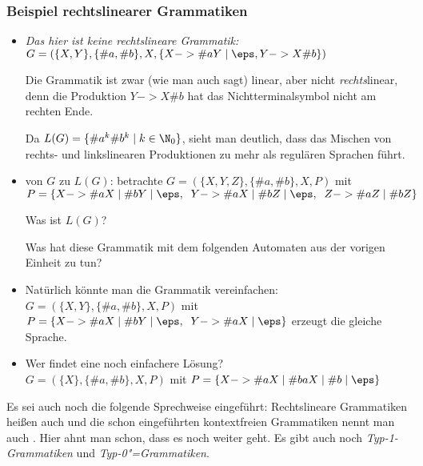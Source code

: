 \begin{tutorium}
  \subsubsection*{Beispiel rechtslinearer Grammatiken}
  \begin{itemize}
  \item \emph{Das hier ist keine rechtslineare Grammatik:} \\
    $G=(\{X, Y\}, \{\#a,\#b\}, X, \{X-> \#a Y \mid \eps, Y ->
    X\#b\})$

    Die Grammatik ist zwar (wie man auch sagt) linear, aber nicht
    \emph{rechts}linear, denn die Produktion $Y -> X\#b$ hat das
    Nichtterminalsymbol nicht am rechten Ende.

    Da $L(G)=\{\#a^k\#b^k \mid k\in\N_0\}$, sieht man deutlich, dass
    das Mischen von rechts- und linkslinearen Produktionen zu mehr als
    regulären Sprachen führt.
  \item von $G$ zu $L(G)$: betrachte $G=(\{X,Y,Z\},\{\#a,\#b\},X,P)$
    mit $P=\{X -> \#a X\mid \#b Y \mid \eps,\;\; Y->\#a X \mid \#b
    Z\mid \eps,\;\; Z->\#aZ \mid \#b Z\}$

    Was ist $L(G)$?

    Was hat diese Grammatik mit dem folgenden Automaten aus der
    vorigen Einheit zu tun?
    
  \item Natürlich könnte man die Grammatik vereinfachen:
    $G=(\{X,Y\},\{\#a,\#b\},X,P)$ mit $P=\{X -> \#a X\mid \#b Y \mid
    \eps,\;\; Y->\#a X \mid \eps\}$ erzeugt die gleiche Sprache.
  \item Wer findet eine noch einfachere Lösung? \\
    $G=(\{X\},\{\#a,\#b\},X,P)$ mit $P=\{X -> \#a X\mid \#{ba}X \mid \#{b} \mid
    \eps\}$
  \end{itemize}
\end{tutorium}
Es sei auch noch die folgende Sprechweise eingeführt: Rechtslineare
Grammatiken heißen auch
und die schon eingeführten kontextfreien Grammatiken nennt man auch
.
Hier ahnt man schon, dass es noch weiter geht. Es gibt auch noch
\emph{Typ-1-Grammatiken} und \emph{Typ-0"=Grammatiken}.

